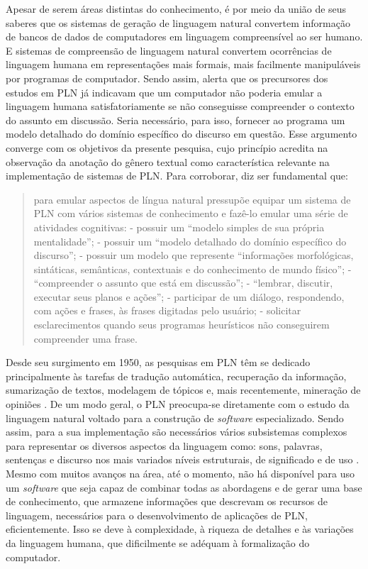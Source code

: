 \documentclass[portuguese]{textolivre}
\begin{document}
Apesar de serem áreas distintas do conhecimento, é por meio da união de seus saberes que os sistemas de geração de linguagem natural convertem informação de bancos de dados de computadores em linguagem compreensível ao ser humano. E sistemas de compreensão de linguagem natural convertem ocorrências de linguagem humana em representações mais formais, mais facilmente manipuláveis por programas de computador. Sendo assim, \textcite{Silva_2006} alerta que os precursores dos estudos em PLN já indicavam que um computador não poderia emular a linguagem humana satisfatoriamente se não conseguisse compreender o contexto do assunto em discussão. Seria necessário, para isso, fornecer ao programa um modelo detalhado do domínio específico do discurso em questão. Esse argumento converge com os objetivos da presente pesquisa, cujo princípio acredita na observação da anotação do gênero textual como característica relevante na implementação de sistemas de PLN. Para corroborar, \textcite{Silva_2006} diz ser fundamental que:

\begin{quote}
    para emular aspectos de língua natural pressupõe equipar um sistema de PLN com vários sistemas de conhecimento e fazê-lo emular uma série de atividades cognitivas: - possuir um “modelo simples de sua própria mentalidade”; - possuir um “modelo detalhado do domínio específico do discurso”; - possuir um modelo que represente “informações morfológicas, sintáticas, semânticas, contextuais e do conhecimento de mundo físico”;  - “compreender o assunto que está em discussão”; - “lembrar, discutir, executar seus planos e ações”; - participar de um diálogo, respondendo, com ações e frases, às frases digitadas pelo usuário; - solicitar esclarecimentos quando seus programas heurísticos não conseguirem compreender uma frase. \cite[p. 122]{Silva_2006}
\end{quote}

Desde seu surgimento em 1950, as pesquisas em PLN têm se dedicado principalmente às tarefas de tradução automática, recuperação da informação, sumarização de textos, modelagem de tópicos e, mais recentemente, mineração de opiniões \cite{cambria_jumping_2014}. De um modo geral, o PLN preocupa-se diretamente com o estudo da linguagem natural voltado para a construção de \textit{software} especializado. Sendo assim, para a sua implementação são necessários vários subsistemas complexos para representar os diversos aspectos da linguagem como: sons, palavras, sentenças e discurso nos mais variados níveis estruturais, de significado e de uso \cite{vieira_linguistica_2001}. Mesmo com muitos avanços na área, até o momento, não há disponível para uso um \textit{software} que seja capaz de combinar todas as abordagens e de gerar uma base de conhecimento, que armazene informações que descrevam os recursos de linguagem, necessários para o desenvolvimento de aplicações de PLN, eficientemente. Isso se deve à complexidade, à riqueza de detalhes e às variações da linguagem humana, que dificilmente se adéquam à formalização do computador.
\end{document}
